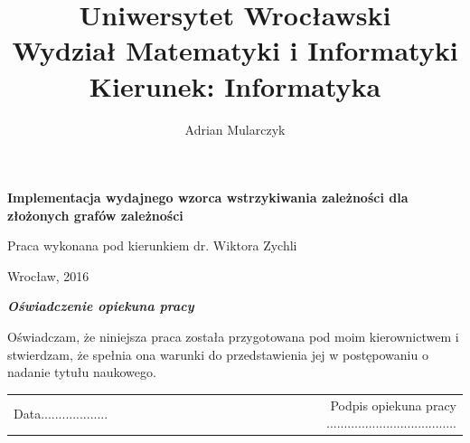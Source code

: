 \documentclass[12pt]{article}
\title{\LARGE{Uniwersytet Wrocławski}\\
\Large{Wydział Matematyki i Informatyki}\\
\large{Kierunek: Informatyka}}
\date{}
\begin{document}
\pagestyle{empty}

\begin{titlepage}
\maketitle
\thispagestyle{empty}


\begin{center}
\author{\LARGE{Adrian Mularczyk}}
\vspace{30pt}

\huge{\textbf{Implementacja wydajnego wzorca wstrzykiwania zależności dla złożonych grafów zależności}}
\vspace{50pt}
\end{center}

\begin{flushright}
\large{Praca wykonana pod kierunkiem}
\large{dr. Wiktora Zychli}
\end{flushright}

\vfill
\begin{center}
\begin{large}
Wrocław, 2016
\end{large}
\end{center}
\end{titlepage}


\setlength{\parindent}{0pt}	%
\setlength{\parskip}{1.5ex} 
\renewcommand*{\figurename}{Rys.}
\renewcommand*{\tablename}{Tab.} 
\renewcommand{\captionsize}{\small}

\setlength{\intextsep}{0pt}


\newpage
\setcounter{page}{2}
\pagestyle{plain}
\textcolor{white}{  }
\begin{center}
\vspace{50pt}
\textbf{\emph{Oświadczenie opiekuna pracy}}\\
\end{center}
Oświadczam, że niniejsza praca została przygotowana pod moim kierownictwem i stwierdzam, że spełnia ona warunki do przedstawienia jej w postępowaniu o nadanie tytułu naukowego.\\

\vspace{54pt}

\begin{tabular}{lccccccccr}
Data................... & & & & & & & & & Podpis opiekuna pracy ..................................... \\
\end{tabular}
\end{document}
